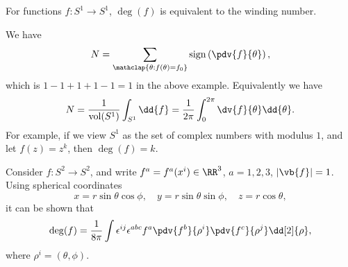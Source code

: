 \documentclass{jknotes}
\begin{document}
\begin{eg}
    For functions \(f:S^1\to S^1\), \(\deg(f)\) is equivalent to the winding number.
    \begin{figure}[H]
        \centering
    \end{figure}
    We have
    \begin{equation}
        N = \sum_{\mathclap{\theta:f(\theta) = f_0}} \operatorname{sign}\left(\pdv{f}{\theta}\right),
    \end{equation}
    which is \(1-1+1+1-1=1\) in the above example.
    Equivalently we have
    \begin{equation}
        N = \frac{1}{\operatorname{vol}(S^1)}\int_{S^1} \dd{f} = \frac{1}{2\pi} \int^{2\pi}_0 \dv{f}{\theta}\dd{\theta}.
    \end{equation}
    For example, if we view \(S^1\) as the set of complex numbers with modulus \(1\), and let \(f(z)=z^k\), then \(\deg(f)=k\).
\end{eg}

\begin{eg}
    Consider \(f:S^2\to S^2\), and write \(f^a = f^a(x^i) \in \RR^3\), \(a=1,2,3\), \(|\vb{f}|=1\). Using spherical coordinates
    \begin{equation}
        x=r\sin\theta\cos\phi,\quad y=r\sin\theta\sin\phi,\quad z=r\cos\theta,
    \end{equation}
    it can be shown that
    \begin{equation}
        \deg(f) = \frac{1}{8\pi}\int\epsilon^{ij}\epsilon^{abc}f^a \pdv{f^b}{\rho^i} \pdv{f^c}{\rho^j}\dd[2]{\rho},
    \end{equation}
    where \(\rho^i = (\theta,\phi)\).
\end{eg}
\end{document}
